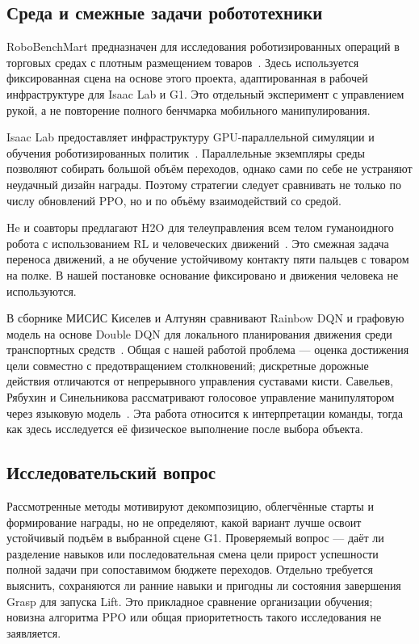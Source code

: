 \documentclass{misisarticle}
\begin{document}
\subsection{Среда и смежные задачи робототехники}
RoboBenchMart предназначен для исследования роботизированных операций в торговых средах с плотным размещением товаров~\cite{robobenchmart}. Здесь используется фиксированная сцена на основе этого проекта, адаптированная в рабочей инфраструктуре для Isaac Lab и G1. Это отдельный эксперимент с управлением рукой, а не повторение полного бенчмарка мобильного манипулирования.

Isaac Lab предоставляет инфраструктуру GPU-параллельной симуляции и обучения роботизированных политик~\cite{isaaclab}. Параллельные экземпляры среды позволяют собирать большой объём переходов, однако сами по себе не устраняют неудачный дизайн награды. Поэтому стратегии следует сравнивать не только по числу обновлений PPO, но и по объёму взаимодействий со средой.

He и соавторы предлагают H2O для телеуправления всем телом гуманоидного робота с использованием RL и человеческих движений~\cite{h2o}. Это смежная задача переноса движений, а не обучение устойчивому контакту пяти пальцев с товаром на полке. В нашей постановке основание фиксировано и движения человека не используются.

В сборнике МИСИС Киселев и Алтунян сравнивают Rainbow DQN и графовую модель на основе Double DQN для локального планирования движения среди транспортных средств~\cite{kiselev}. Общая с нашей работой проблема --- оценка достижения цели совместно с предотвращением столкновений; дискретные дорожные действия отличаются от непрерывного управления суставами кисти. Савельев, Рябухин и Синельникова рассматривают голосовое управление манипулятором через языковую модель~\cite{saveliev}. Эта работа относится к интерпретации команды, тогда как здесь исследуется её физическое выполнение после выбора объекта.

\subsection{Исследовательский вопрос}
Рассмотренные методы мотивируют декомпозицию, облегчённые старты и формирование награды, но не определяют, какой вариант лучше освоит устойчивый подъём в выбранной сцене G1. Проверяемый вопрос --- даёт ли разделение навыков или последовательная смена цели прирост успешности полной задачи при сопоставимом бюджете переходов. Отдельно требуется выяснить, сохраняются ли ранние навыки и пригодны ли состояния завершения Grasp для запуска Lift. Это прикладное сравнение организации обучения; новизна алгоритма PPO или общая приоритетность такого исследования не заявляется.
\end{document}
